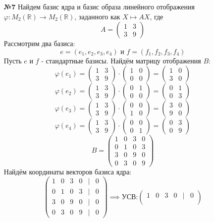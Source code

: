 \documentclass[a4paper]{article}
\newcommand{\mat}[1]{\begin{pmatrix} #1 \end{pmatrix}}
\renewcommand{\phi}{\varphi}
\begin{document}
\begin{enumerate}
    \item[\textbf{№7}]Найдем базис ядра и базис образа линейного отображения $\varphi: M_{2}(\mathbb{R}) \rightarrow M_{2}(\mathbb{R})$, заданного как $X \mapsto A X$, где 
    $$
    A = \begin{pmatrix} 1 & 3 \\ 3 & 9 \end{pmatrix}
    $$
    Рассмотрим два базиса:
    $$e = (e_1, e_2, e_3, e_4) \text{ и } f = (f_1, f_2, f_3, f_4)$$
    Пусть $e$ и $f$ - стандартные базисы. Найдём матрицу отображения $B$:\\
    $$\phi(e_1) = \begin{pmatrix} 1 & 3 \\ 3 & 9 \end{pmatrix} \cdot \mat{1 & 0 \\ 0 & 0}=\begin{pmatrix} 1 & 0 \\ 3 & 0 \end{pmatrix}$$    
    $$\phi(e_2) = \begin{pmatrix} 1 & 3 \\ 3 & 9 \end{pmatrix} \cdot \mat{0 & 1 \\ 0 & 0}=\begin{pmatrix} 0 & 1 \\ 0 & 3 \end{pmatrix}$$ 
    $$\phi(e_3) = \begin{pmatrix} 1 & 3 \\ 3 & 9 \end{pmatrix} \cdot \mat{0 & 0 \\ 1 & 0}=\begin{pmatrix} 3 & 0 \\ 9 & 0 \end{pmatrix}$$ 
    $$\phi(e_4) = \begin{pmatrix} 1 & 3 \\ 3 & 9 \end{pmatrix} \cdot \mat{0 & 0 \\ 0 & 1}=\begin{pmatrix} 0 & 3 \\ 0 & 9 \end{pmatrix}$$
    $$B = \mat{1 & 0 & 3 & 0 \\ 0 &  1 &  0 &  3 \\ 3 &  0 &  9 &  0 \\ 0 &  3 & 0 & 9}$$
    Найдём координаты векторов базиса ядра:
    $$\mat{1 & 0 & 3 & 0 & | & 0 \\ 0 &  1 &  0 &  3 & | & 0\\ 3 &  0 &  9 &  0 & | & 0\\ 0 &  3 & 0 & 9 & | & 0} \implies \text{УСВ:} \mat{1 & 0 & 3 & 0 & | & 0 \\
}$$
\end{enumerate}
\end{document}
